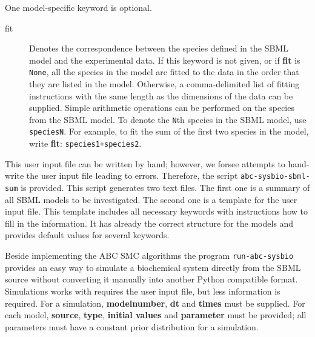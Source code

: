 \documentclass[a4paper]{report}
\begin{document}
One model-specific keyword is optional.
\begin{description}
\item[fit] Denotes the correspondence between the species defined in the SBML model and the experimental data. If this keyword is not given, or if \textbf{fit} is \verb$None$, all the species in the model are fitted to the data in the order that they are listed in the model. Otherwise, a comma-delimited list of fitting instructions with the same length as the dimensions of the data can be supplied. Simple arithmetic operations can be performed on the species from the SBML model. To denote the \verb$N$th species in the SBML model, use \verb$speciesN$. For example, to fit the sum of the first two species in the model, write \textbf{fit}: \verb$species1+species2$.
\end{description}
This user input file can be written by hand; however, we forsee attempts to hand-write the user input file leading to errors. Therefore, the script \verb$abc-sysbio-sbml-sum$ is provided. This script generates two text files. The first one is a summary of all SBML models to be investigated. The second one is a template for the user input file. This template includes all necessary keywords with instructions how to fill in the information. It has already the correct structure for the models and provides default values for several keywords.

Beside implementing the ABC SMC algorithms the program \verb$run-abc-sysbio$ provides an easy way to simulate a biochemical system directly from  the SBML source without converting it manually into another Python compatible format. Simulations works with requires the user input file, but less information is required. For a simulation, \textbf{modelnumber}, \textbf{dt} and \textbf{times} must be supplied. For each model, \textbf{source}, \textbf{type}, \textbf{initial values} and \textbf{parameter} must be provided; all parameters must have a constant prior distribution for a simulation.
\end{document}
